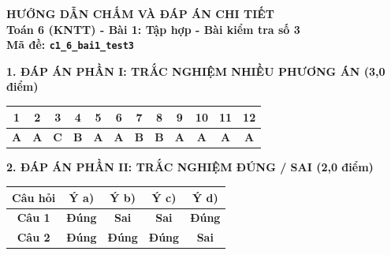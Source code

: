 \documentclass[11pt,a4paper]{article}
\begin{document}
\newpage
\begin{center}
{\Large\bfseries HƯỚNG DẪN CHẤM VÀ ĐÁP ÁN CHI TIẾT}\\[4pt]
{\large\bfseries Toán 6 (KNTT) - Bài 1: Tập hợp - Bài kiểm tra số 3}\\[2pt]
{\bfseries Mã đề: \texttt{c1\_6\_bai1\_test3}}
\end{center}

\vspace{10pt}
\noindent\textbf{\large 1. ĐÁP ÁN PHẦN I: TRẮC NGHIỆM NHIỀU PHƯƠNG ÁN (3,0 điểm)}
\vspace{4pt}
\begin{center}
\begin{tabular}{|c|c|c|c|c|c|c|c|c|c|c|c|}
\hline
\textbf{1} & \textbf{2} & \textbf{3} & \textbf{4} & \textbf{5} & \textbf{6} & \textbf{7} & \textbf{8} & \textbf{9} & \textbf{10} & \textbf{11} & \textbf{12} \\
\hline
\textbf{A} & \textbf{A} & \textbf{C} & \textbf{B} & \textbf{A} & \textbf{A} & \textbf{B} & \textbf{B} & \textbf{A} & \textbf{A} & \textbf{A} & \textbf{A} \\
\hline
\end{tabular}
\end{center}
\vspace{6pt}


\noindent\textbf{\large 2. ĐÁP ÁN PHẦN II: TRẮC NGHIỆM ĐÚNG / SAI (2,0 điểm)}
\vspace{4pt}
\begin{center}
\begin{tabular}{|c|c|c|c|c|}
\hline
\textbf{Câu hỏi} & \textbf{Ý a)} & \textbf{Ý b)} & \textbf{Ý c)} & \textbf{Ý d)} \\
\hline
\textbf{Câu 1} & \textbf{Đúng} & \textbf{Sai} & \textbf{Sai} & \textbf{Đúng} \\
\hline
\textbf{Câu 2} & \textbf{Đúng} & \textbf{Đúng} & \textbf{Đúng} & \textbf{Sai} \\
\hline
\end{tabular}
\end{center}
\vspace{6pt}
\end{document}
